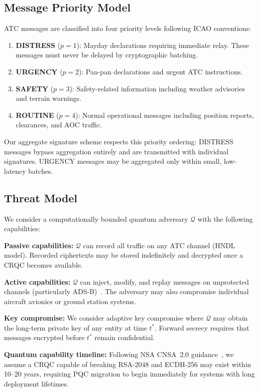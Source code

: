 \documentclass[conference,10pt]{IEEEtran}
\begin{document}
\subsection{Message Priority Model}

ATC messages are classified into four priority levels following ICAO conventions:
\begin{enumerate}
    \item \textbf{DISTRESS} ($p=1$): Mayday declarations requiring immediate relay. These messages must never be delayed by cryptographic batching.
    \item \textbf{URGENCY} ($p=2$): Pan-pan declarations and urgent ATC instructions.
    \item \textbf{SAFETY} ($p=3$): Safety-related information including weather advisories and terrain warnings.
    \item \textbf{ROUTINE} ($p=4$): Normal operational messages including position reports, clearances, and AOC traffic.
\end{enumerate}

Our aggregate signature scheme respects this priority ordering: DISTRESS messages bypass aggregation entirely and are transmitted with individual signatures. URGENCY messages may be aggregated only within small, low-latency batches.

\subsection{Threat Model}

We consider a computationally bounded quantum adversary $\mathcal{Q}$ with the following capabilities:

\textbf{Passive capabilities:} $\mathcal{Q}$ can record all traffic on any ATC channel (HNDL model). Recorded ciphertexts may be stored indefinitely and decrypted once a CRQC becomes available.

\textbf{Active capabilities:} $\mathcal{Q}$ can inject, modify, and replay messages on unprotected channels (particularly ADS-B)~\cite{costin2012ghost, schafer2014experimental}. The adversary may also compromise individual aircraft avionics or ground station systems.

\textbf{Key compromise:} We consider adaptive key compromise where $\mathcal{Q}$ may obtain the long-term private key of any entity at time $t^*$. Forward secrecy requires that messages encrypted before $t^*$ remain confidential.

\textbf{Quantum capability timeline:} Following NSA CNSA~2.0 guidance~\cite{nsa2022cnsa2}, we assume a CRQC capable of breaking RSA-2048 and ECDH-256 may exist within 10--20 years, requiring PQC migration to begin immediately for systems with long deployment lifetimes.
\end{document}
